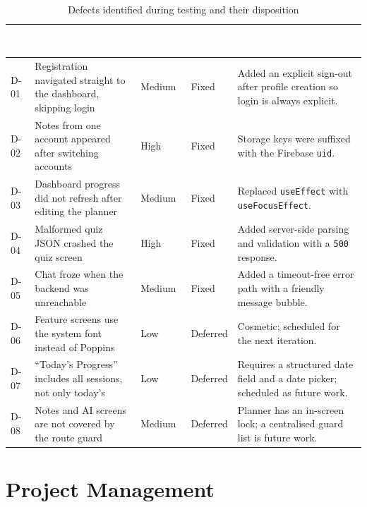 \documentclass[12pt,a4paper,oneside]{report}
\begin{document}
\begin{table}[H]
\centering
\caption{Defects identified during testing and their disposition}
\label{tab:defects}
\small
\begin{tabularx}{\textwidth}{@{}p{1.2cm}p{4.6cm}p{1.6cm}p{2.0cm}X@{}}
\toprule
\rowcolor{tblhead} \textcolor{white}{\textbf{ID}} &
\textcolor{white}{\textbf{Description}} &
\textcolor{white}{\textbf{Severity}} &
\textcolor{white}{\textbf{Status}} &
\textcolor{white}{\textbf{Resolution / justification}} \\
\midrule
D-01 & Registration navigated straight to the dashboard, skipping login & Medium & Fixed & Added an explicit sign-out after profile creation so login is always explicit. \\
D-02 & Notes from one account appeared after switching accounts & High & Fixed & Storage keys were suffixed with the Firebase \texttt{uid}. \\
D-03 & Dashboard progress did not refresh after editing the planner & Medium & Fixed & Replaced \texttt{useEffect} with \texttt{useFocusEffect}. \\
D-04 & Malformed quiz JSON crashed the quiz screen & High & Fixed & Added server-side parsing and validation with a \texttt{500} response. \\
D-05 & Chat froze when the backend was unreachable & Medium & Fixed & Added a timeout-free error path with a friendly message bubble. \\
D-06 & Feature screens use the system font instead of Poppins & Low & Deferred & Cosmetic; scheduled for the next iteration. \\
D-07 & ``Today's Progress'' includes all sessions, not only today's & Low & Deferred & Requires a structured date field and a date picker; scheduled as future work. \\
D-08 & Notes and AI screens are not covered by the route guard & Medium & Deferred & Planner has an in-screen lock; a centralised guard list is future work. \\
\bottomrule
\end{tabularx}
\end{table}

\chapter{Project Management}\label{ch:pm}
\end{document}
